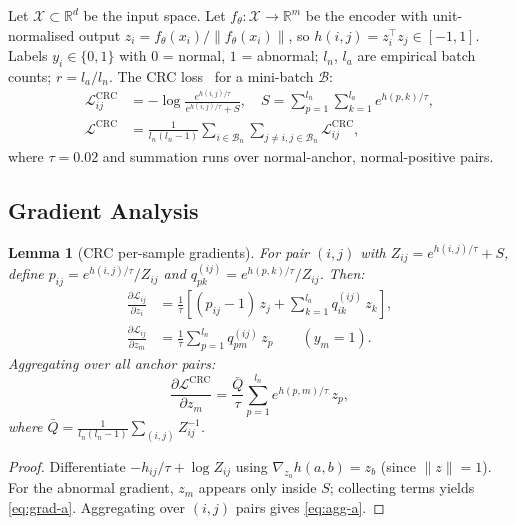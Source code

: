 \documentclass[conference]{IEEEtran}
\newtheorem{lemma}[theorem]{Lemma}
\begin{document}
Let $\mathcal{X} \subset \mathbb{R}^d$ be the input space.
Let $f_\theta : \mathcal{X} \to \mathbb{R}^m$ be the encoder with
unit-normalised output $z_i = f_\theta(x_i)/\|f_\theta(x_i)\|$, so
$h(i,j) = z_i^\top z_j \in [-1,1]$.
Labels $y_i \in \{0,1\}$ with $0$ = normal, $1$ = abnormal;
$l_n$, $l_a$ are empirical batch counts; $r = l_a/l_n$.
The CRC loss~\cite{zhang2024aoc} for a mini-batch $\mathcal{B}$:
\begin{align}
\mathcal{L}_{ij}^{\text{CRC}} &= -\log
  \frac{e^{h(i,j)/\tau}}{e^{h(i,j)/\tau} + S}, \quad
S = \sum_{p=1}^{l_n}\sum_{k=1}^{l_a} e^{h(p,k)/\tau},\label{eq:crc}\\
\mathcal{L}^{\text{CRC}} &= \frac{1}{l_n(l_n-1)}
  \sum_{i \in \mathcal{B}_n}\sum_{j \neq i, j \in \mathcal{B}_n}
  \mathcal{L}_{ij}^{\text{CRC}},\nonumber
\end{align}
where $\tau = 0.02$ and summation runs over normal-anchor, normal-positive pairs.

\subsection{Gradient Analysis}

\begin{lemma}[CRC per-sample gradients]\label{lem:grad}
For pair $(i,j)$ with $Z_{ij} = e^{h(i,j)/\tau} + S$,
define $p_{ij} = e^{h(i,j)/\tau}/Z_{ij}$ and
$q_{pk}^{(ij)} = e^{h(p,k)/\tau}/Z_{ij}$. Then:
\begin{align}
\frac{\partial \mathcal{L}_{ij}}{\partial z_i}
&= \frac{1}{\tau}\!\left[
   (p_{ij}-1)\,z_j +
   \sum_{k=1}^{l_a} q_{ik}^{(ij)}\, z_k
\right], \label{eq:grad-n}\\
\frac{\partial \mathcal{L}_{ij}}{\partial z_m}
&= \frac{1}{\tau}\sum_{p=1}^{l_n} q_{pm}^{(ij)}\, z_p
\qquad (y_m = 1). \label{eq:grad-a}
\end{align}
Aggregating over all anchor pairs:
\begin{equation}
\frac{\partial \mathcal{L}^{\text{CRC}}}{\partial z_m}
= \frac{\bar{Q}}{\tau}\sum_{p=1}^{l_n} e^{h(p,m)/\tau}\,z_p,
\label{eq:agg-a}
\end{equation}
where $\bar{Q} = \tfrac{1}{l_n(l_n-1)}\sum_{(i,j)} Z_{ij}^{-1}$.
\end{lemma}

\begin{proof}
Differentiate $-h_{ij}/\tau + \log Z_{ij}$ using
$\nabla_{z_a} h(a,b) = z_b$ (since $\|z\|=1$). For the abnormal
gradient, $z_m$ appears only inside $S$; collecting terms yields
\eqref{eq:grad-a}. Aggregating over $(i,j)$ pairs gives \eqref{eq:agg-a}.
\end{proof}
\end{document}

